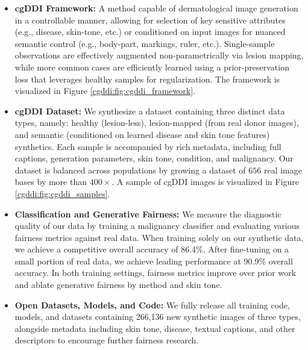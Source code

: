 \documentclass[11pt]{ucthesis}
\begin{document}
\begin{itemize}
    \item \textbf{cgDDI Framework:} A method capable of dermatological image generation in a controllable manner, allowing for selection of key sensitive attributes (e.g., disease, skin-tone, etc.) or conditioned on input images for nuanced semantic control (e.g., body-part, markings, ruler, etc.). Single-sample observations are effectively augmented non-parametrically via lesion mapping, while more common cases are efficiently learned using a prior-preservation loss that leverages healthy samples for regularization. The framework is visualized in Figure \ref{cgddi:fig:cgddi_framework}.

    \item \textbf{cgDDI Dataset:} We synthesize a dataset containing three distinct data types, namely: healthy (lesion-less), lesion-mapped (from real donor images), and semantic (conditioned on learned disease and skin tone features) synthetics. Each sample is accompanied by rich metadata, including full captions, generation parameters, skin tone, condition, and malignancy. Our dataset is balanced across populations by growing a dataset of $656$ real image bases by more than $400\times$. A sample of cgDDI images is visualized in Figure \ref{cgddi:fig:cgddi_samples}.

    \item \textbf{Classification and Generative Fairness:} We measure the diagnostic quality of our data by training a malignancy classifier and evaluating various fairness metrics against real data. When training solely on our synthetic data, we achieve a competitive overall accuracy of 86.4\%. After fine-tuning on a small portion of real data, we achieve leading performance at 90.9\% overall accuracy. In both training settings, fairness metrics improve over prior work and ablate generative fairness by method and skin tone.
    
    \item \textbf{Open Datasets, Models, and Code:} We fully release all training code, models, and datasets containing 266,136 new synthetic images of three types, alongside metadata including skin tone, disease, textual captions, and other descriptors to encourage further fairness research.
\end{itemize}
\end{document}
